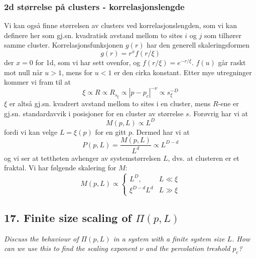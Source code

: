 \documentclass[english, a4paper]{article}
\begin{document}
\subsubsection{2d størrelse på clusters - korrelasjonslengde}
Vi kan også finne størrelsen av clusters ved korrelasjonslengden, som vi kan definere her
som gj.sn. kvadratisk avstand mellom to sites $i$ og $j$ som tilhører samme cluster. Korrelasjonsfunksjonen
$g(r)$ har den generell skaleringsformen
\begin{equation}
 g(r) = r^xf(r/\xi)
\end{equation}
der $x=0$ for 1d, som vi har sett ovenfor, og $f(r/\xi) = e^{-r/\xi}$. $f(u)$ går raskt mot null når
$u > 1$, mens for $u < 1$ er den cirka konstant. Etter mye utregninger kommer vi fram til at
\begin{equation}
 \xi \propto R \propto R_{s_\xi} \propto |p-p_c|^{-\nu} \propto s_\xi^{-D}
\end{equation}
$\xi$ er altså gj.sn. kvadrert avstand mellom to sites i en cluster, mens $R$-ene er gj.sn. standardavvik
i posisjoner for en cluster av størrelse $s$. Forøvrig har vi at
\begin{equation}
 M(p,L) \propto L^D
\end{equation}
fordi vi kan velge $L = \xi(p)$ for en gitt $p$. Dermed har vi at
\begin{equation}
 P(p,L) = \frac{M(p,L)}{L^d} \propto L^{D-d}
\end{equation}
og vi ser at tettheten avhenger av systemstørrelsen $L$, dvs. at clusteren er et fraktal. 
Vi har følgende skalering for $M$:
\begin{equation}
M(p,L) \propto
\begin{cases}
 L^D, & L \ll \xi \\
 \xi^{D-d} L^d & L \gg \xi
\end{cases}
\end{equation}


\subsection{ 17. Finite size scaling of $\Pi(p,L)$ }
\textit{Discuss the behaviour of $\Pi(p,L)$ in a system with a finite system size $L$. 
How can we use this to find the scaling exponent $\nu$ and the percolation treshold $p_c$?}\\

\noindent



















 
\end{document}
